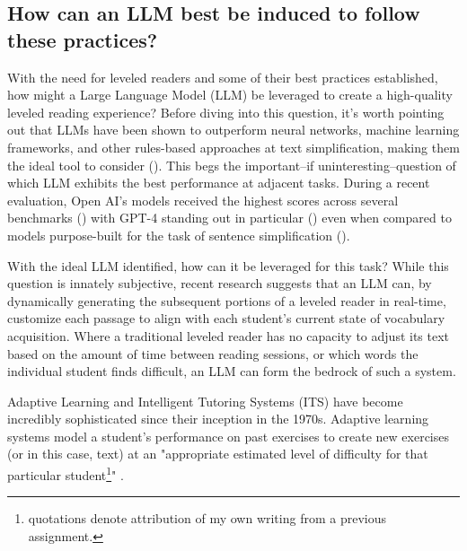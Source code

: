 \documentclass[
	letterpaper, %
]{jdf}
\newcommand{\pcite}[1]{(\cite{#1})}
\begin{document}
\subsection{How can an LLM best be induced to follow these practices?}

With the need for leveled readers and some of their best practices established, how might a Large Language Model (LLM) be leveraged to create a high-quality leveled reading experience? Before diving into this question, it's worth pointing out that LLMs have been shown to outperform neural networks, machine learning frameworks, and other rules-based approaches at text simplification, making them the ideal tool to consider \pcite{feng2023sentence}. This begs the important–if uninteresting–question of which LLM exhibits the best performance at adjacent tasks. During a recent evaluation, Open AI's models received the highest scores across several benchmarks \pcite{kew2023bless} with GPT-4 standing out in particular \pcite{wu2024indepth} even when compared to models purpose-built for the task of sentence simplification \pcite{ai_human_taking_turns_creating_story}.

With the ideal LLM identified, how can it be leveraged for this task? While this question is innately subjective, recent research suggests that an LLM can, by dynamically generating the subsequent portions of a leveled reader in real-time, customize each passage to align with each student's current state of vocabulary acquisition. Where a traditional leveled reader has no capacity to adjust its text based on the amount of time between reading sessions, or which words the individual student finds difficult, an LLM can form the bedrock of such a system.

Adaptive Learning and Intelligent Tutoring Systems (ITS) have become incredibly sophisticated since their inception in the 1970s. Adaptive learning systems model a student's performance on past exercises to create new exercises (or in this case, text) at an "appropriate estimated level of difficulty for that particular student\footnote{quotations denote attribution of my own writing from a previous assignment.}" \cite{important_adaptive_learning_exercise_generation}.
\end{document}
